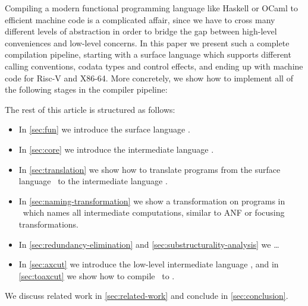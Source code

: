 Compiling a modern functional programming language like Haskell or OCaml to efficient machine code is a complicated affair, since we have to cross many different levels of abstraction in order to bridge the gap between high-level conveniences and low-level concerns.
In this paper we present such a complete compilation pipeline, starting with a surface language which supports different calling conventions, codata types and control effects, and ending up with machine code for Risc-V and X86-64.
More concretely, we show how to implement all of the following stages in the compiler pipeline:
\medskip

\begin{center}
\end{center}

The rest of this article is structured as follows:
\begin{itemize}
    \item In \cref{sec:fun} we introduce the surface language \surfacelang.
    \item In \cref{sec:core} we introduce the intermediate language \targetlang.
    \item In \cref{sec:translation} we show how to translate programs from the surface language \surfacelang\ to the intermediate language \targetlang.
    \item In \cref{sec:naming-transformation} we show a transformation on programs in \targetlang\ which names all intermediate computations, similar to ANF or focusing transformations.
    \item In \cref{sec:redundancy-elimination} and \cref{sec:substructurality-analysis} we \ldots
    \item In \cref{sec:axcut} we introduce the low-level intermediate language \machinelang, and in \cref{sec:toaxcut} we show how to compile \targetlang\ to \machinelang.
\end{itemize}
We discuss related work in \cref{sec:related-work} and conclude in \cref{sec:conclusion}.
